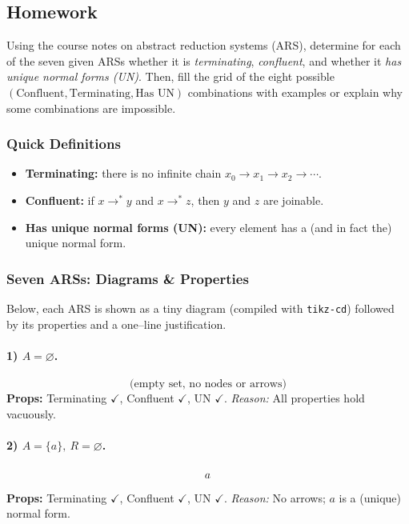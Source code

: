 \documentclass{article}
\theoremstyle{theorem}
\theoremstyle{definition}
\theoremstyle{remark}
\begin{document}
\subsection*{Homework}
Using the course notes on abstract reduction systems (ARS), determine for each of the seven given ARSs whether it is \emph{terminating}, \emph{confluent}, and whether it \emph{has unique normal forms (UN)}. Then, fill the grid of the eight possible \((\text{Confluent}, \text{Terminating}, \text{Has UN})\) combinations with examples or explain why some combinations are impossible.

\subsubsection*{Quick Definitions}
\begin{itemize}
  \item \textbf{Terminating:} there is no infinite chain \(x_0 \to x_1 \to x_2 \to \cdots\).
  \item \textbf{Confluent:} if \(x \to^* y\) and \(x \to^* z\), then \(y\) and \(z\) are joinable.
  \item \textbf{Has unique normal forms (UN):} every element has a (and in fact the) unique normal form.
\end{itemize}

\subsubsection*{Seven ARSs: Diagrams \& Properties}
Below, each ARS is shown as a tiny diagram (compiled with \texttt{tikz-cd}) followed by its properties and a one–line justification.

\paragraph{1) \(A=\varnothing\).}
\[
\text{(empty set, no nodes or arrows)}
\]
\textbf{Props:} Terminating \(\checkmark\), Confluent \(\checkmark\), UN \(\checkmark\). \emph{Reason:} All properties hold vacuously.

\paragraph{2) \(A=\{a\},\ R=\varnothing\).}
\[
\begin{tikzcd}
a
\end{tikzcd}
\]
\textbf{Props:} Terminating \(\checkmark\), Confluent \(\checkmark\), UN \(\checkmark\). \emph{Reason:} No arrows; \(a\) is a (unique) normal form.
\end{document}
